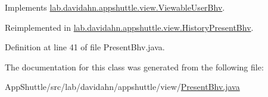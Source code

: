 \-Implements \hyperlink{classlab_1_1davidahn_1_1appshuttle_1_1view_1_1_viewable_user_bhv_adb1627e7a6c14729e24d56ce42957508}{lab.\-davidahn.\-appshuttle.\-view.\-Viewable\-User\-Bhv}.



\-Reimplemented in \hyperlink{classlab_1_1davidahn_1_1appshuttle_1_1view_1_1_history_present_bhv_a09890fe5f71f759a429d646a7446ccf9}{lab.\-davidahn.\-appshuttle.\-view.\-History\-Present\-Bhv}.



\-Definition at line 41 of file \-Present\-Bhv.\-java.



\-The documentation for this class was generated from the following file\-:\begin{DoxyCompactItemize}
\item 
\-App\-Shuttle/src/lab/davidahn/appshuttle/view/\hyperlink{_present_bhv_8java}{\-Present\-Bhv.\-java}\end{DoxyCompactItemize}
